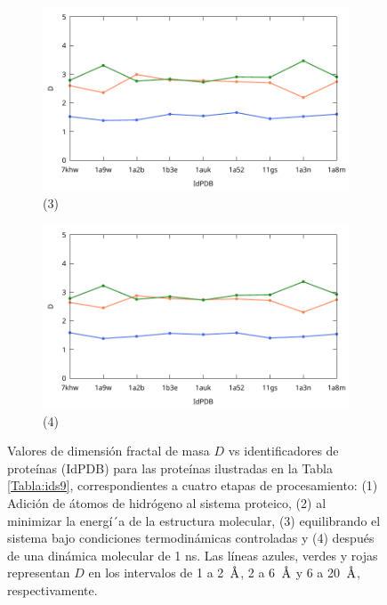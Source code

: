 \begin{figure}[H]
		\begin{subfigure}{0.49\textwidth}
			\centering
			\includegraphics[width=\linewidth,page=1]{graphs/PDBs/Dvsldx/DvsEq.pdf}
			\caption{(3)}
		\end{subfigure}
		\hfill
		\begin{subfigure}{0.49\textwidth}
			\centering
			\includegraphics[width=\linewidth,page=1]{graphs/PDBs/Dvsldx/DvsDm.pdf}
			\caption{(4)}
		\end{subfigure}
		
		\caption{Valores de dimensi\'{o}n fractal de masa $D$ vs identificadores de prote\'{i}nas (IdPDB) para las prote\'{i}nas ilustradas en la Tabla \ref{Tabla:ids9}, correspondientes a cuatro etapas de procesamiento: (1) Adici\'{o}n de \'{a}tomos de hidr\'{o}geno al sistema proteico, (2) al minimizar la energ\'{i´}a de la estructura molecular, (3) equilibrando el sistema bajo condiciones termodin\'{a}micas controladas y (4) despu\'{e}s de una din\'{a}mica molecular de 1 ns. Las líneas azules, verdes y rojas representan $D$ en los intervalos de 1 a 2~$\textup{\r{A}}$, 2 a 6~$\textup{\r{A}}$ y 6 a 20~$\textup{\r{A}}$, respectivamente.}
		\label{fig:Df-general}
	\end{figure}
	
